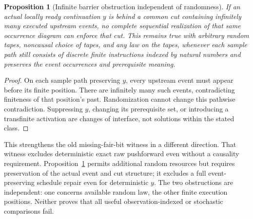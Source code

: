 \documentclass{article}
\newtheorem{proposition}{Proposition}
\begin{document}
\begin{proposition}[Infinite barrier obstruction independent of randomness]\label{prop:infinite}
If an actual locally ready continuation $y$ is behind a common cut containing infinitely many executed upstream events, no complete sequential realization of that same occurrence diagram can enforce that cut. This remains true with arbitrary random tapes, noncausal choice of tapes, and any law on the tapes, whenever each sample path still consists of discrete finite instructions indexed by natural numbers and preserves the event occurrences and prerequisite meaning.
\end{proposition}
\begin{proof}
On each sample path preserving $y$, every upstream event must appear before its finite position. There are infinitely many such events, contradicting finiteness of that position's past. Randomization cannot change this pathwise contradiction. Suppressing $y$, changing its prerequisite set, or introducing a transfinite activation are changes of interface, not solutions within the stated class.
\end{proof}

This strengthens the old missing-fair-bit witness in a different direction. That witness excludes deterministic exact raw pushforward even without a causality requirement. Proposition~\ref{prop:infinite} permits additional random resources but requires preservation of the actual event and cut structure; it excludes a full event-preserving schedule repair even for deterministic $y$. The two obstructions are independent: one concerns available random law, the other finite execution positions. Neither proves that all useful observation-indexed or stochastic comparisons fail.
\end{document}

